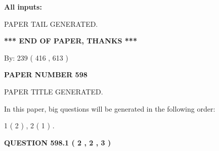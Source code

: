 \documentclass{ctexart}
\begin{document}
   
   
   
\noindent{}
   
   
   
   
\noindent\vspace{0.1in}\hspace{-0.08in} {\textbf{\Large{All inputs: }}}
   
   
   
   
   
   
 \vspace{0.2in}
 
   
   
\vspace{2.0in} PAPER TAIL GENERATED.
   
   
   
   
\vspace{1.0in} 
{\textbf{\large{ *** END OF PAPER, THANKS *** }}} 
   
   
\hspace{1.0in} By: 
 239 ( 416 ,  613 )
   
   
   
   
\newpage 
\setcounter{page}{ 
   598001 } 
   
   
   
   
 {\textbf{ \Large{ PAPER NUMBER  598  }}}
   
   
\vspace{0.2in}
   
   
   
   
   
   
   
   
 \vspace{0.2in}
 
 
 
 
   
   
 PAPER TITLE GENERATED.
   
   
   
\vspace{0.2in}
   
In this paper, big questions will be generated in the following order: 
   
   
   1 ( 2 )
 ,
   2 ( 1 )
 .
  
\vspace{0.2in}
  
{\textbf{\Large{QUESTION
598.1 
 ( 2 , 2 , 3 )
}}}
  
\end{document}
